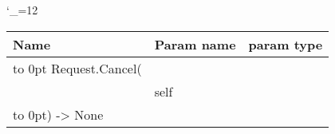 \begingroup \catcode`\_=12 \tt
\begin{tabular}{lll}
\toprule
\textrm{Name}&\textrm{Param name}&\textrm{param type}\\
\midrule
\hbox to 0pt {Request.Cancel(\hss}\\
& self\\
\hbox to 0pt{) -> None\hss}\\
\bottomrule
\end{tabular}
\endgroup
